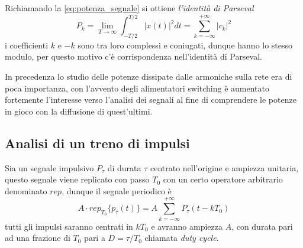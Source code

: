 Richiamando la \ref{eq:potenza_segnale}
si ottiene \textit{l'identità di Parseval}
$$
P_k = \lim_{T\to\infty} \int_{-T/2}^{T/2} |x(t)|^2 dt =
\sum_{k=-\infty}^{+\infty} |c_k|^2
$$
i coefficienti $k$ e $-k$ sono tra loro complessi e
coniugati, dunque hanno lo stesso modulo, per questo motivo c'è corrispondenza
nell'identità di Parseval.

In precedenza lo studio delle potenze dissipate dalle armoniche sulla rete era
di poca importanza, con l'avvento degli alimentatori switching è aumentato
fortemente l'interesse verso l'analisi dei segnali al fine di comprendere le
potenze in gioco con la diffusione di quest'ultimi.


\subsection{Analisi di un treno di impulsi}
Sia un segnale impulsivo $P_\tau$ di durata $\tau$ centrato nell'origine e
ampiezza unitaria, questo segnale viene replicato con passo $T_0$ con un certo
operatore arbitrario denominato $rep$, dunque il segnale periodico è
$$
A\cdot rep_{T_0} \{p_\tau(t) \} = A\sum_{k=-\infty}^{+\infty} P_\tau(t-kT_0)
$$
 tutti gli impulsi saranno centrati in $kT_0$ e avranno ampiezza $A$, con
durata pari ad una frazione di $T_0$ pari a $D = \tau/T_0$ chiamata
\textit{duty cycle}.

